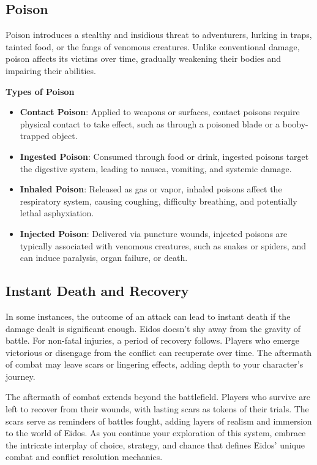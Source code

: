 \subsection{Poison}

Poison introduces a stealthy and insidious threat to adventurers, lurking in traps, tainted food, or the fangs of venomous creatures. Unlike conventional damage, poison affects its victims over time, gradually weakening their bodies and impairing their abilities.

\textbf{Types of Poison}

\begin{itemize}
    \item \textbf{Contact Poison}: Applied to weapons or surfaces, contact poisons require physical contact to take effect, such as through a poisoned blade or a booby-trapped object.
    \item \textbf{Ingested Poison}: Consumed through food or drink, ingested poisons target the digestive system, leading to nausea, vomiting, and systemic damage.
    \item \textbf{Inhaled Poison}: Released as gas or vapor, inhaled poisons affect the respiratory system, causing coughing, difficulty breathing, and potentially lethal asphyxiation.
    \item \textbf{Injected Poison}: Delivered via puncture wounds, injected poisons are typically associated with venomous creatures, such as snakes or spiders, and can induce paralysis, organ failure, or death.
\end{itemize}

\subsection{Instant Death and Recovery}

In some instances, the outcome of an attack can lead to instant death if the damage dealt is significant enough. Eidos doesn't shy away from the gravity of battle.
For non-fatal injuries, a period of recovery follows. Players who emerge victorious or disengage from the conflict can recuperate over time. The aftermath of combat may leave scars or lingering effects, adding depth to your character's journey.

The aftermath of combat extends beyond the battlefield. Players who survive are left to recover from their wounds, with lasting scars as tokens of their trials. The scars serve as reminders of battles fought, adding layers of realism and immersion to the world of Eidos.
As you continue your exploration of this system, embrace the intricate interplay of choice, strategy, and chance that defines Eidos' unique combat and conflict resolution mechanics.



